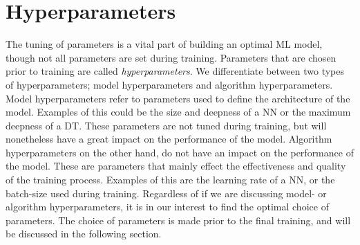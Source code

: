 \section{Hyperparameters}
The tuning of parameters is a vital part of building an optimal \ac{ML}
model, though not all parameters are set during training. Parameters 
that are chosen prior to training are called \emph{hyperparameters}. We differentiate
between two types of hyperparameters; model hyperparameters and algorithm 
hyperparameters. Model hyperparameters refer to parameters used to define the 
architecture of the model. Examples of this could be the size and deepness of 
a \ac{NN} or the maximum deepness of a \ac{DT}. These parameters are not tuned
during training, but will nonetheless have a great impact on the performance 
of the model. Algorithm hyperparameters on the other hand, do not have an impact 
on the performance of the model. These are parameters that mainly effect the 
effectiveness and quality of the training process. Examples of this are the 
learning rate of a \ac{NN}, or the batch-size used during training. Regardless 
of if we are discussing model- or algorithm hyperparameters, it is in our interest
to find the optimal choice of parameters. The choice of parameters is made 
prior to the final training, and will be discussed in the following section.